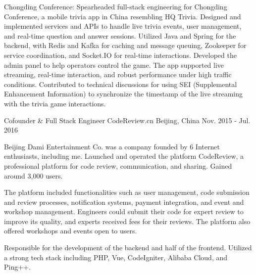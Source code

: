 \begin{cventries}
{\begin{cvitems}
    \item {Chongding Conference: Spearheaded full-stack engineering for Chongding Conference, a mobile trivia app in China resembling HQ Trivia. Designed and implemented services and APIs to handle live trivia events, user management, and real-time question and answer sessions. Utilized Java and Spring for the backend, with Redis and Kafka for caching and message queuing, Zookeeper for service coordination, and Socket.IO for real-time interactions. Developed the admin panel to help operators control the game. The app supported live streaming, real-time interaction, and robust performance under high traffic conditions. Contributed to technical discussions for using SEI (Supplemental Enhancement Information) to synchronize the timestamp of the live streaming with the trivia game interactions.}
  \end{cvitems}
}

\cventry
{Cofounder \& Full Stack Engineer} %
{CodeReview.cn} %
{Beijing, China} %
{Nov. 2015 - Jul. 2016} %
{
  \begin{cvitems} %
    \item {Beijing Dami Entertainment Co. was a company founded by 6 Internet enthusiasts, including me. Launched and operated the platform CodeReview, a professional platform for code review, communication, and sharing. Gained around 3,000 users.}
    \item {The platform included functionalities such as user management, code submission and review processes, notification systems, payment integration, and event and workshop management. Engineers could submit their code for expert review to improve its quality, and experts received fees for their reviews. The platform also offered workshops and events open to users.}
    \item {Responsible for the development of the backend and half of the frontend. Utilized a strong tech stack including PHP, Vue, CodeIgniter, Alibaba Cloud, and Ping++.}
  \end{cvitems}
}


\end{cventries}
